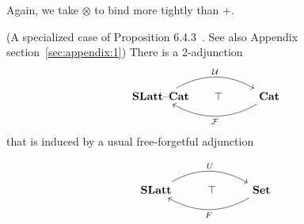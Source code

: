Again, we take $\otimes$ to bind more tightly than $+$.


\begin{proposition}(A specialized case of Proposition 6.4.3~\cite{Borceux_1994}. See also Appendix section~\ref{sec:appendix:1})
There is a 2-adjunction 
\[\begin{tikzcd}
	\catname{SLatt}\text{--}\catname{Cat}\arrow[rr, "\mathcal{U}", bend left] & \hspace{-1em}\top & \catname{Cat} \arrow[ll, "\mathcal{F}", bend left]
	\end{tikzcd}
\]
that is induced by a usual free-forgetful adjunction 

\[\begin{tikzcd}
	\catname{SLatt} \arrow[rr, "U", bend left] & \top & \catname{Set} \arrow[ll, "F", bend left]
	\end{tikzcd}
\]
\end{proposition}

